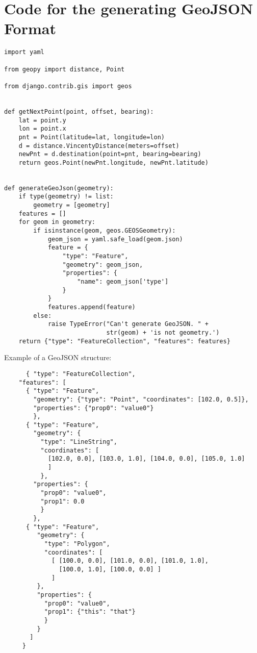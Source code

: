 \chapter{Code for the generating GeoJSON Format} \label{code-geojson}
\begin{small}
\begin{verbatim}
import yaml

from geopy import distance, Point

from django.contrib.gis import geos


def getNextPoint(point, offset, bearing):
    lat = point.y
    lon = point.x
    pnt = Point(latitude=lat, longitude=lon)
    d = distance.VincentyDistance(meters=offset)
    newPnt = d.destination(point=pnt, bearing=bearing)
    return geos.Point(newPnt.longitude, newPnt.latitude)


def generateGeoJson(geometry):
    if type(geometry) != list:
        geometry = [geometry]
    features = []
    for geom in geometry:
        if isinstance(geom, geos.GEOSGeometry):
            geom_json = yaml.safe_load(geom.json)
            feature = {
                "type": "Feature",
                "geometry": geom_json,
                "properties": {
                    "name": geom_json['type']
                }
            }
            features.append(feature)
        else:
            raise TypeError("Can't generate GeoJSON. " +
                            str(geom) + 'is not geometry.')
    return {"type": "FeatureCollection", "features": features}

\end{verbatim}

Example of a GeoJSON structure:
    \begin{verbatim}
      { "type": "FeatureCollection",
    "features": [
      { "type": "Feature",
        "geometry": {"type": "Point", "coordinates": [102.0, 0.5]},
        "properties": {"prop0": "value0"}
        },
      { "type": "Feature",
        "geometry": {
          "type": "LineString",
          "coordinates": [
            [102.0, 0.0], [103.0, 1.0], [104.0, 0.0], [105.0, 1.0]
            ]
          },
        "properties": {
          "prop0": "value0",
          "prop1": 0.0
          }
        },
      { "type": "Feature",
         "geometry": {
           "type": "Polygon",
           "coordinates": [
             [ [100.0, 0.0], [101.0, 0.0], [101.0, 1.0],
               [100.0, 1.0], [100.0, 0.0] ]
             ]
         },
         "properties": {
           "prop0": "value0",
           "prop1": {"this": "that"}
           }
         }
       ]
     }
    \end{verbatim}
\end{small}